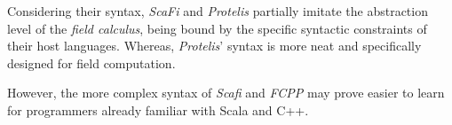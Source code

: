 Considering their syntax, \emph{ScaFi} and \emph{Protelis} partially imitate the abstraction level of the \emph{field calculus},
being bound by the specific syntactic constraints of their host languages.
Whereas, \emph{Protelis}' syntax is more neat and specifically designed for field computation.

However, the more complex syntax of \emph{Scafi} and \emph{FCPP} may prove easier to learn for programmers already familiar with Scala and C++.